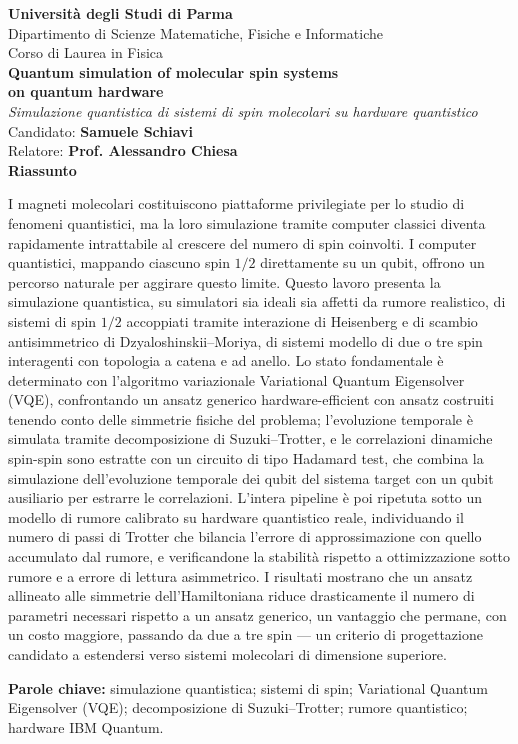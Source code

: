\documentclass[11pt,a4paper]{article}
\begin{document}
\begin{center}
{\large\bfseries Università degli Studi di Parma}\\[2pt]
{\normalsize Dipartimento di Scienze Matematiche, Fisiche e Informatiche}\\[4pt]
{\normalsize Corso di Laurea in Fisica}\\[18pt]

{\Large\bfseries Quantum simulation of molecular spin systems\\ on quantum hardware}\\[6pt]
{\normalsize\itshape Simulazione quantistica di sistemi di spin molecolari su hardware quantistico}\\[18pt]

{\normalsize Candidato: \textbf{Samuele Schiavi}}\\[4pt]
{\normalsize Relatore: \textbf{Prof. Alessandro Chiesa}}\\[18pt]
{\normalsize\bfseries Riassunto}
\end{center}

\vspace{6pt}
\onehalfspacing
\noindent
I magneti molecolari costituiscono piattaforme privilegiate per lo
studio di fenomeni quantistici, ma la loro simulazione tramite computer
classici diventa rapidamente intrattabile al crescere del numero di spin
coinvolti. I computer quantistici, mappando ciascuno spin $1/2$ direttamente
su un qubit, offrono un percorso naturale per aggirare questo limite.
Questo lavoro presenta la simulazione quantistica, su simulatori sia ideali
sia affetti da rumore realistico, di sistemi di spin $1/2$ accoppiati
tramite interazione di Heisenberg e di scambio antisimmetrico di
Dzyaloshinskii--Moriya, di sistemi modello di due o tre spin interagenti con
topologia a catena e ad anello. Lo stato fondamentale è determinato con
l'algoritmo variazionale Variational Quantum Eigensolver (VQE), confrontando
un ansatz generico hardware-efficient con ansatz costruiti tenendo conto
delle simmetrie fisiche del problema; l'evoluzione temporale è simulata
tramite decomposizione di Suzuki--Trotter, e le correlazioni dinamiche
spin-spin sono estratte con un circuito di tipo Hadamard test, che combina
la simulazione dell'evoluzione temporale dei qubit del sistema target con un
qubit ausiliario per estrarre le correlazioni. L'intera pipeline è poi
ripetuta sotto un modello di rumore calibrato su hardware quantistico reale,
individuando il numero di passi di Trotter che bilancia l'errore di
approssimazione con quello accumulato dal rumore, e verificandone la
stabilità rispetto a ottimizzazione sotto rumore e a errore di lettura
asimmetrico. I risultati mostrano che un ansatz allineato alle simmetrie
dell'Hamiltoniana riduce drasticamente il numero di parametri necessari
rispetto a un ansatz generico, un vantaggio che permane, con un costo
maggiore, passando da due a tre spin --- un criterio di progettazione
candidato a estendersi verso sistemi molecolari di dimensione superiore.

\vspace{12pt}
\noindent\textbf{Parole chiave:} simulazione quantistica; sistemi di spin;
Variational Quantum Eigensolver (VQE); decomposizione di Suzuki--Trotter;
rumore quantistico; hardware IBM Quantum.
\end{document}

